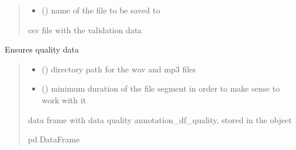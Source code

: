 \documentclass[letterpaper,10pt,english]{sphinxmanual}
\begin{document}
\begin{fulllineitems}
\begin{fulllineitems}
\begin{quote}
\begin{description}
\begin{itemize}
\item {} 
\sphinxAtStartPar
{} () \textendash{} name of the file to be saved to

\end{itemize}

\sphinxAtStartPar
csv file with the validation data

\end{description}\end{quote}

\end{fulllineitems}


\begin{fulllineitems}
\label{\detokenize{BeeData:BeeData.BeeData.data_quality}}
\pysigstartsignatures
{}
\pysigstopsignatures
\sphinxAtStartPar
Ensures quality data
\begin{quote}\begin{description}
\begin{itemize}
\item {} 
\sphinxAtStartPar
{} () \textendash{} directory path for the wav and mp3 files

\item {} 
\sphinxAtStartPar
{} () \textendash{} minimum duration of the file segment in order to make sense to work with it

\end{itemize}

\sphinxAtStartPar
data frame with data quality annotation\_df\_quality, stored in the object

\sphinxAtStartPar
pd.DataFrame

\end{description}\end{quote}


\end{fulllineitems}
\end{fulllineitems}
\end{document}
